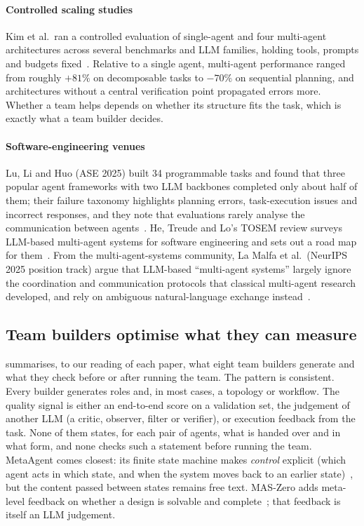 \documentclass[10pt,a4paper]{article}
\begin{document}
\paragraph{Controlled scaling studies} Kim et al.\ ran a controlled
evaluation of single-agent and four multi-agent architectures across
several benchmarks and LLM families, holding tools, prompts and budgets
fixed~\cite{kim2025scaling}. Relative to a single agent, multi-agent
performance ranged from roughly $+81\%$ on decomposable tasks to $-70\%$ on
sequential planning, and architectures without a central verification
point propagated errors more. Whether a team helps depends on whether its
structure fits the task, which is exactly what a team builder decides.

\paragraph{Software-engineering venues} Lu, Li and Huo (ASE 2025) built 34
programmable tasks and found that three popular agent frameworks with two
LLM backbones completed only about half of them; their failure taxonomy
highlights planning errors, task-execution issues and incorrect responses,
and they note that evaluations rarely analyse the communication between
agents~\cite{lu2025exploring}. He, Treude and Lo's TOSEM review surveys
LLM-based multi-agent systems for software engineering and sets out a road
map for them~\cite{he2025lma}.
From the multi-agent-systems community, La Malfa et al.\ (NeurIPS 2025
position track) argue that LLM-based ``multi-agent systems'' largely
ignore the coordination and communication protocols that classical
multi-agent research developed, and rely on ambiguous natural-language
exchange instead~\cite{lamalfa2025miss}.

\subsection{Team builders optimise what they can measure}\label{sec:ev-builders}

 summarises, to our reading of each paper, what eight
team builders generate and what they check before or after running the
team. The pattern is consistent. Every builder generates roles and, in most
cases, a topology or workflow. The quality signal is either an end-to-end
score on a validation set, the judgement of another LLM (a critic, observer,
filter or verifier), or execution feedback from the task. None of them
states, for each pair of agents, what is handed over and in what form, and
none checks such a statement before running the team. MetaAgent comes
closest: its finite state machine makes \emph{control} explicit (which agent
acts in which state, and when the system moves back to an earlier
state)~\cite{zhang2025metaagent}, but the content passed between states
remains free text. MAS-Zero adds meta-level feedback on whether a design is
solvable and complete~\cite{ke2025maszero}; that feedback is itself an LLM
judgement.
\end{document}

